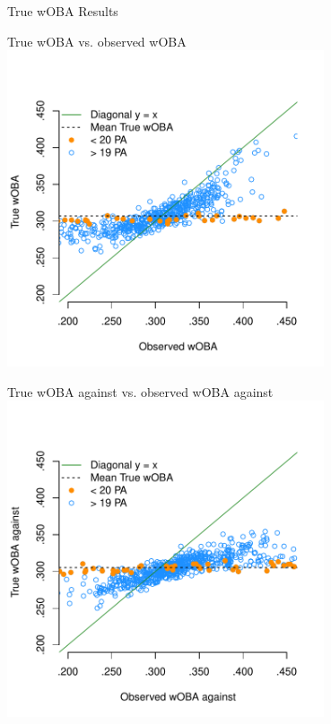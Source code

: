 \documentclass{beamer}
\begin{document}
\begin{frame}
\centering\LARGE True wOBA Results
\end{frame}

\begin{frame}{True wOBA vs. observed wOBA}
\centering
\includegraphics[width = 0.7\textwidth]{../figs/true-woba-batters.pdf}
\end{frame}

\begin{frame}{True wOBA against vs. observed wOBA against}
\centering
\includegraphics[width = 0.7\textwidth]{../figs/true-woba-pitchers.pdf}
\end{frame}
\end{document}
